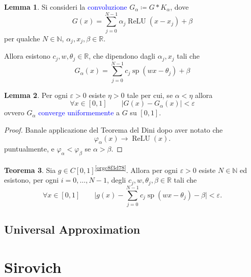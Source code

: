 \documentclass[10pt]{book}
\newcommand{\1}{\mathds{1}}
\newcommand{\R}{\mathds{R}}
\newcommand{\N}{\mathds{N}}
\newcommand{\conv}{\mathbin{*}}
\theoremstyle{definition}%
\newtheorem{thm}{Teorema}[section]
\newtheorem{lem}[thm]{Lemma}
\theoremstyle{plain}
\theoremstyle{remark}
\renewcommand{\href}[2]{\textcolor{blue}{#2}}
\begin{document}
\begin{lem}
Si consideri la \href{../../../../../org/roam/20250703105424-prodotto_di_convoluzione.org}{convoluzione} \(G_{\alpha}\coloneqq G\conv K_{\alpha}\), dove
\begin{equation*}
G(x) = \sum_{j=0}^{N-1} \alpha_{j} \operatorname{ReLU}(x-x_{j})+\beta
\end{equation*}
per qualche \(N \in \N\), \(\alpha_{j}, x_{j}, \beta \in \R\).

Allora esistono \(c_{j}, w, \theta_{j} \in \R\), che dipendono dagli \(\alpha_{j}, x_{j}\) tali che
\begin{equation*}
G_{\alpha}(x) = \sum_{j=0}^{N-1}c_{j}\operatorname{sp}(wx-\theta_{j}) + \beta
\end{equation*}
\end{lem}

\begin{lem}
Per ogni \(\varepsilon>0\) esiste \(\eta>0\) tale per cui, se \(\alpha<\eta\) allora
\begin{equation*}
\forall x \in [0,1]\qquad |G(x)-G_{\alpha}(x)|<\varepsilon
\end{equation*}
ovvero \(G_{\alpha}\) \href{../../../../../org/roam/20250629105745-convergenza_uniforme.org}{converge uniformemente} a \(G\) su \([0,1]\).
\end{lem}

\begin{proof}
Banale applicazione del Teorema del Dini dopo aver notato che
\begin{equation*}
\varphi_{\alpha}(x)\to \operatorname{ReLU}(x).
\end{equation*}
puntualmente, e \(\varphi_{\alpha}<\varphi_{\beta}\) se \(\alpha>\beta\).
\end{proof}

\begin{thm}
Sia \(g \in C[0,1]\)\textsuperscript{\ref{orgc8f3d78}}. Allora per ogni \(\varepsilon>0\) esiste \(N \in \N\) ed esistono, per ogni \(i=0,\dots,N-1\), degli \(c_{j},w,\theta_{j},\beta \in \R\) tali che
\begin{equation*}
\forall x \in [0,1]\qquad \bigg\lvert g(x)-\sum_{j=0}^{N-1}c_{j}\operatorname{sp}(wx-\theta_{j})-\beta\bigg\rvert<\varepsilon.
\end{equation*}
\end{thm}
\chapter{Universal Approximation}
\label{sec:orgd7d8db1}



\part{Sirovich}
\end{document}
